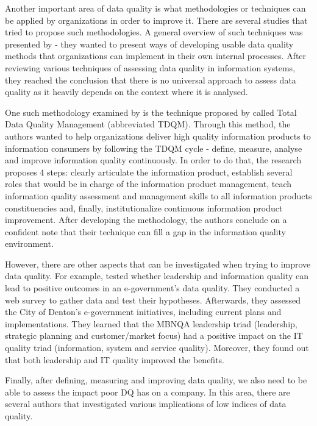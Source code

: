 \documentclass{mprop}
\begin{document}
Another important area of data quality is what methodologies or techniques can 
be applied by organizations in order to improve it. 
There are several studies that tried to propose such methodologies. A general 
overview of such techniques  was presented by \citet{pipino2002data} - they 
wanted to present ways of developing usable  data quality methods that 
organizations can implement in their own internal processes. After reviewing 
various techniques of assessing data quality in information systems, they reached 
the conclusion that there is no universal approach to assess data quality as it  
heavily depends on the context where it is analysed. 

One such methodology examined by \citet{pipino2002data} is the technique 
proposed by \citet{wang1998product} called Total Data Quality Management
(abbreviated TDQM). Through this method, the authors wanted to help 
organizations deliver high quality information products to information
consumers by following the TDQM cycle - define, measure, analyse and improve
information quality continuously. In order to do that, the research proposes
4 steps: clearly articulate the information product, establish several roles
that would be in charge of the information product management, teach information
quality assessment and management skills to all information products 
constituencies and, finally, institutionalize continuous information product 
improvement. After developing the methodology, the authors conclude on a 
confident note that their technique can fill a gap in the information quality
environment.

However, there are other aspects that can be investigated when trying to improve
data quality. For example, \citet{prybutok2008evaluating} tested whether  
leadership and information quality can lead to positive outcomes in an 
e-government's data quality. They conducted a web survey to gather data and test 
their hypotheses. Afterwards, they assessed the City of Denton's e-government 
initiatives, including current plans and implementations. They learned that the 
MBNQA leadership triad (leadership, strategic planning and customer/market focus) 
had a positive impact on the IT quality triad (information, system and service 
quality). Moreover, they found out that both leadership and IT quality improved 
the benefits.

Finally, after defining, measuring and improving data quality, we also need
to be able to assess the impact poor DQ has on a company. In this area, there
are several authors that investigated various implications of low indices
of data quality.
\end{document}
